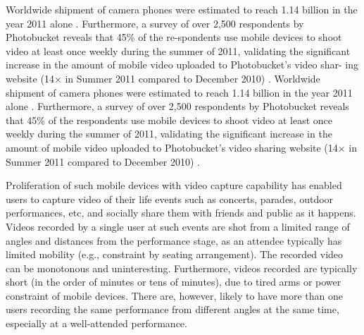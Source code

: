 \documentclass{new}
\begin{document}
%
%
Worldwide shipment of camera phones were estimated to reach
1.14 billion in the year 2011 alone \cite{1}. Furthermore, a survey of
over 2,500 respondents by Photobucket reveals that 45\% of the re-spondents use mobile devices to shoot video at least once weekly
during the summer of 2011, validating the significant increase in
the amount of mobile video uploaded to Photobucket’s video shar-
ing website (14× in Summer 2011 compared to December 2010) \cite{2}.
Worldwide shipment of camera phones were estimated to reach 1.14 billion in the year 2011 alone \cite{1}. Furthermore, a survey of over 2,500 respondents by Photobucket reveals that 45\% of the respondents use mobile devices to shoot video at least once weekly during the summer of 2011, validating the significant increase in the amount of mobile video uploaded to Photobucket’s video sharing website (14× in Summer 2011 compared to December 2010) \cite{2}. 

Proliferation of such mobile devices with video capture capability has enabled users to capture video of their life events such as concerts, parades, outdoor performances, etc, and socially share them with friends and public as it happens. Videos recorded by a single user at such events are shot from a limited range of angles and distances from the performance stage, as an attendee typically has limited mobility (e.g., constraint by seating arrangement). The recorded video can be monotonous and uninteresting. Furthermore, videos recorded are typically short (in the order of minutes or tens of minutes), due to tired arms or power constraint of mobile devices. There are, however, likely to have more than one users recording the same performance from different angles at the same time, especially at a well-attended performance. 
\end{document}
